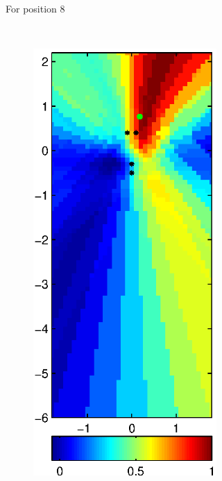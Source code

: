 \documentclass[spanish,openright]{book}
\newcommand{\verticalSpacingSRPMaps}{-0.3cm}
\begin{document}
\begin{figure}
\begin{subfigure}[t]{0.47\textwidth}
\begin{minipage}[t]{\textwidth}
\begin{subfigure}[t]{0.3\textwidth}
\label{fig:SRP_Fo1500_mean_pos08}
\end{subfigure}
\vspace{\verticalSpacingSRPMaps}
\caption{\centering For position 8}
\vspace{0.25cm}
\end{minipage}
\end{subfigure}
~\begin{subfigure}[t]{0.47\textwidth}
\begin{minipage}[t]{\textwidth}
\begin{subfigure}[t]{0.3\textwidth}
\includegraphics[width=\textwidth]{Pattern_Fo1500_pos16}

\end{subfigure}
\end{minipage}
\end{subfigure}
\end{figure}
\end{document}
